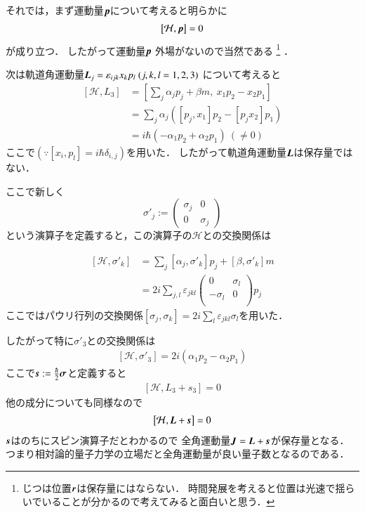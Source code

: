 \documentclass[a4paper,11pt]{jsarticle}
\numberwithin{equation}{section}
\newcommand{\bvec}[1]{\mbox{\boldmath $#1$}}
\begin{document}
それでは，まず運動量$\bvec{p}$について考えると明らかに
\begin{align}
  \left[\mathcal{H},\bvec{p}\right] =0 
\end{align}
が成り立つ．
したがって運動量$\bvec{p}$
外場がないので当然である
\footnote{じつは位置$\bvec{r}$は保存量にはならない．
時間発展を考えると位置は光速で揺らいでいることが分かるので考えてみると面白いと思う．}
．

次は軌道角運動量$\bvec{L}_j =   \varepsilon_{ijk}x_kp_l\ (j,k,l=1,2,3)$
について考えると
\begin{align}
  \left[\mathcal{H},L_3\right] &= \left[\sum_j \alpha_jp_j+\beta m,\ x_1p_2-x_2p_1\right] \nonumber\\
  &=\sum_j \alpha_j\left([p_j,x_1]p_2-[p_jx_2]p_1\right) \nonumber\\
  &=i\hbar (-\alpha_1p_2+\alpha_2p_1)\ (\neq 0)\label{軌道}
\end{align}
ここで$\left(\because \left[x_i,p_l\right]=i\hbar\delta_{i,j}\right)$を用いた．
したがって軌道角運動量$\bvec{L}$は保存量ではない．

ここで新しく
\begin{equation}
\sigma'_j := \left(
\begin{array}{cc}
  \sigma_j & 0 \\
  0 & \sigma_j 
\end{array}
\right)
\end{equation}
という演算子を定義すると，この演算子の$\mathcal{H}$との交換関係は

\begin{equation}
  \begin{aligned}
    \left[\mathcal{H},\sigma'_k\right]&= \sum_j[\alpha_j,\sigma'_k]p_j + [\beta,\sigma'_k]m\\
  &= 2i \sum_{j,l} \varepsilon_{jkl} \left(
    \begin{array}{cc}
      0 & \sigma_l \\
      -\sigma_l & 0 \\
    \end{array}
    \right)p_j 
  \end{aligned}
\end{equation}
ここではパウリ行列の交換関係$[\sigma_j,\sigma_k]=2i\sum_{l}\varepsilon_{jkl}\sigma_l$を用いた．

したがって特に$\sigma'_3$との交換関係は
\begin{align}
  \left[\mathcal{H},\sigma'_3\right]=2i(\alpha_1p_2-\alpha_2p_1)
\end{align}
ここで$\bvec{s}:=\frac{\hbar}{2}\bvec{\sigma}$と定義すると
\begin{align}
  \left[\mathcal{H},L_3+s_3\right] =0
\end{align}
他の成分についても同様なので
\begin{align}
\left[\mathcal{H},\bvec{L}+\bvec{s}\right] =0
\end{align}
$\bvec{s}$はのちにスピン演算子だとわかるので
全角運動量$\bvec{J}=\bvec{L}+\bvec{s}$が保存量となる．
つまり相対論的量子力学の立場だと全角運動量が良い量子数となるのである．
\end{document}
